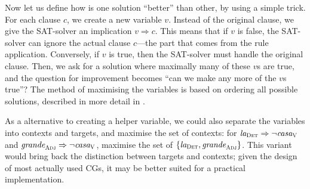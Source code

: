 Now let us define how is one solution ``better'' than other,
by using a simple trick. 
For each clause $c$, we create a new variable $v$. 
Instead of the original clause, we give the SAT-solver 
an implication $v \Rightarrow c$. 
This means that if $v$ is false, the SAT-solver can ignore the 
actual clause $c$---the part that comes from the rule application.
Conversely, if $v$ is true, then the SAT-solver must handle
the original clause.
Then, we ask for a solution where maximally many of these $v$s are true,
and the question for improvement becomes ``can we make any more of the $v$s true''?
The method of maximising the variables is based on ordering all possible solutions, 
described in more detail in \cite{een06minisatplus}.

As a alternative to creating a helper variable, we could also separate the variables into 
contexts and targets, and maximise the set of contexts: for $\text{\em la}_{\text{\sc Det}} \Rightarrow \neg \text{\em casa}_{\text{\sc V}}$
and $\text{\em grande}_{\text{\sc Adj}} \Rightarrow \neg \text{\em casa}_{\text{\sc V}}$, maximise the set of $\{\text{\em la}_{\text{\sc Det}}, \text{\em grande}_{\text{\sc Adj}}\}$.
This variant would bring back the distinction between targets and contexts; given the design of most actually used CGs, it may be better suited for a practical implementation.




